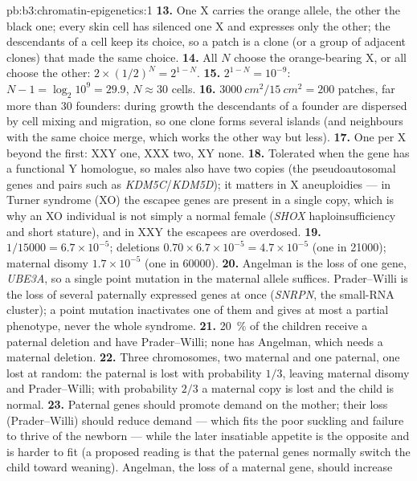 \begin{solution}{pb:b3:chromatin-epigenetics:1}
\textbf{13.} One X carries the orange allele, the other the black one;
every skin cell has silenced one X and expresses only the other; the
descendants of a cell keep its choice, so a patch is a clone (or a group
of adjacent clones) that made the same choice.
\textbf{14.} All $N$ choose the orange-bearing X, or all choose the
other: $2\times (1/2)^{N} = 2^{1-N}$.
\textbf{15.} $2^{1-N} = 10^{-9}$: $N - 1 = \log_{2} 10^{9} = 29.9$,
$N \approx 30$ cells.
\textbf{16.} $\qty{3000}{cm^2}/\qty{15}{cm^2} = 200$ patches, far more
than $30$ founders: during growth the descendants of a founder are
dispersed by cell mixing and migration, so one clone forms several
islands (and neighbours with the same choice merge, which works the
other way but less).
\textbf{17.} One  per X beyond the first: XXY one, XXX two, XY
none.
\textbf{18.} Tolerated when the gene has a functional Y homologue, so
males also have two copies (the pseudoautosomal genes and pairs such as
\emph{KDM5C}/\emph{KDM5D}); it matters in X aneuploidies --- in Turner
syndrome (XO) the escapee genes are present in a single copy, which is
why an XO individual is not simply a normal female (\emph{SHOX}
haploinsufficiency and short stature), and in XXY the escapees are
overdosed.
\textbf{19.} $1/\num{15000} = 6.7\times 10^{-5}$; deletions $0.70\times
6.7\times 10^{-5} = 4.7\times 10^{-5}$ (one in \num{21000}); maternal
disomy $1.7\times 10^{-5}$ (one in \num{60000}).
\textbf{20.} Angelman is the loss of one gene, \emph{UBE3A}, so a single
point mutation in the maternal allele suffices. Prader--Willi is the
loss of several paternally expressed genes at once (\emph{SNRPN}, the
small-RNA cluster); a point mutation inactivates one of them and gives
at most a partial phenotype, never the whole syndrome.
\textbf{21.} \qty{20}{\%} of the children receive a paternal deletion and
have Prader--Willi; none has Angelman, which needs a maternal deletion.
\textbf{22.} Three chromosomes, two maternal and one paternal, one lost
at random: the paternal is lost with probability $1/3$, leaving
maternal disomy and Prader--Willi; with probability $2/3$ a maternal
copy is lost and the child is normal.
\textbf{23.} Paternal genes should promote demand on the mother; their
loss (Prader--Willi) should reduce demand --- which fits the poor
suckling and failure to thrive of the newborn --- while the later
insatiable appetite is the opposite and is harder to fit (a proposed
reading is that the paternal genes normally switch the child toward
weaning). Angelman, the loss of a maternal gene, should increase

\end{solution}
